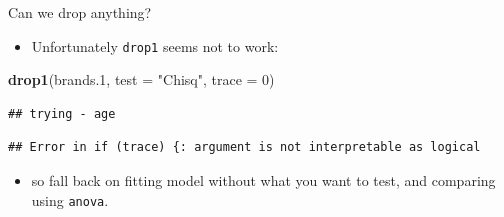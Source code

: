 \documentclass[ignorenonframetext,]{beamer}
\newenvironment{Shaded}{\begin{snugshade}}{\end{snugshade}}
\newcommand{\DataTypeTok}[1]{\textcolor[rgb]{0.13,0.29,0.53}{#1}}
\newcommand{\DecValTok}[1]{\textcolor[rgb]{0.00,0.00,0.81}{#1}}
\newcommand{\FloatTok}[1]{\textcolor[rgb]{0.00,0.00,0.81}{#1}}
\newcommand{\KeywordTok}[1]{\textcolor[rgb]{0.13,0.29,0.53}{\textbf{#1}}}
\newcommand{\NormalTok}[1]{#1}
\newcommand{\StringTok}[1]{\textcolor[rgb]{0.31,0.60,0.02}{#1}}
\providecommand{\tightlist}{%
  \setlength{\itemsep}{0pt}\setlength{\parskip}{0pt}}
\begin{document}
\begin{frame}[fragile]{Can we drop anything?}
\protect\hypertarget{can-we-drop-anything}{}

\begin{itemize}
\tightlist
\item
  Unfortunately \texttt{drop1} seems not to work:
\end{itemize}

\begin{Shaded}
\begin{Highlighting}[]
\KeywordTok{drop1}\NormalTok{(brands}\FloatTok{.1}\NormalTok{, }\DataTypeTok{test =} \StringTok{"Chisq"}\NormalTok{, }\DataTypeTok{trace =} \DecValTok{0}\NormalTok{)}
\end{Highlighting}
\end{Shaded}

\begin{verbatim}
## trying - age
\end{verbatim}

\begin{verbatim}
## Error in if (trace) {: argument is not interpretable as logical
\end{verbatim}

\begin{itemize}
\tightlist
\item
  so fall back on fitting model without what you want to test, and
  comparing using \texttt{anova}.
\end{itemize}

\end{frame}
\end{document}
